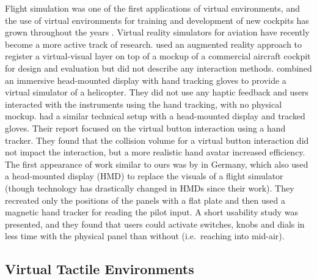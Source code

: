 Flight simulation was one of the first applications of virtual environments, and the use of virtual environments for training and development of new cockpits has grown throughout the years \citep{hancock_human_2008}.
Virtual reality simulators for aviation have recently become a more active track of research.
\citet{wan_mrstudio:_2011} used an augmented reality approach to register a virtual-visual layer on top of a mockup of a commercial aircraft cockpit for design and evaluation but did not describe any interaction methods.
\citet{yavrucuk_low_2011} combined an immersive head-mounted display with hand tracking gloves to provide a virtual simulator of a helicopter.
They did not use any haptic feedback and users interacted with the instruments using the hand tracking, with no physical mockup.
\citet{aslandere_virtual_2015} had a similar technical setup with a head-mounted display and tracked gloves.
Their report focused on the virtual button interaction using a hand tracker.
They found that the collision volume for a virtual button interaction did not impact the interaction, but a more realistic hand avatar increased efficiency.
The first appearance of work similar to ours was by \citet{schiefele_simple_1998} in Germany, which also used a head-mounted display (HMD) to replace the visuals of a flight simulator (though technology has drastically changed in HMDs since their work).
They recreated only the positions of the panels with a flat plate and then used a magnetic hand tracker for reading the pilot input.
A short usability study was presented, and they found that users could activate switches, knobs and dials in less time with the physical panel than without (i.e.\ reaching into mid-air).


\subsection{Virtual Tactile Environments}
\label{virtual-tactile-environments}


